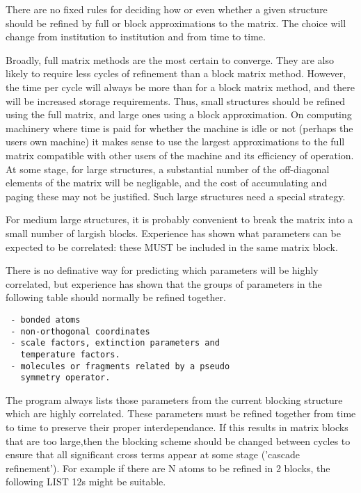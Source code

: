 \documentclass[10pt,a4paper]{report}
\begin{document}
There are no fixed rules for deciding how or even whether a given structure
 should be refined by full or block approximations to the matrix. The choice
 will change from institution to institution and from time to time.


Broadly, full matrix methods are the most certain to converge. They are
 also likely to require less cycles of refinement than a block matrix method.
 However, the time per cycle will always be more than for a block matrix
 method, and there will be increased storage requirements. Thus, small
 structures should be refined using the full matrix, and large ones using a
 block approximation. On computing machinery where time is paid for whether 
 the machine is idle or not (perhaps the users own machine) it makes sense
 to use the largest approximations to the full matrix compatible with other
 users of the machine and its efficiency of operation. At some stage, for
 large structures, a substantial number of the off-diagonal elements of the
 matrix will be negligable, and the cost of accumulating and paging these
 may not be justified. Such large structures need a special strategy.


For medium large structures, it is probably convenient to break the matrix
 into a small number of largish blocks. Experience has shown what parameters
 can be expected to be correlated: these MUST be included in the same matrix
 block.


\bigskip{}




There is no definative way for predicting which parameters will be highly
 correlated, but experience has shown that the groups of parameters in the
 following table should normally be refined together.

\small\begin{verbatim}
 - bonded atoms
 - non-orthogonal coordinates
 - scale factors, extinction parameters and 
   temperature factors.
 - molecules or fragments related by a pseudo
   symmetry operator.
\end{verbatim}\normalsize


 The program always lists those parameters from the current blocking
 structure which are highly correlated. These parameters must be refined
 together from time to time to preserve their proper interdependance.
 If this results in matrix blocks that
 are too large,then the blocking scheme should be changed between cycles
 to ensure that all significant cross terms appear at some stage 
 ('cascade refinement').
 For example
 if there are N atoms to be refined in 2 blocks, the following LIST 12s might
 be suitable. 
\end{document}
